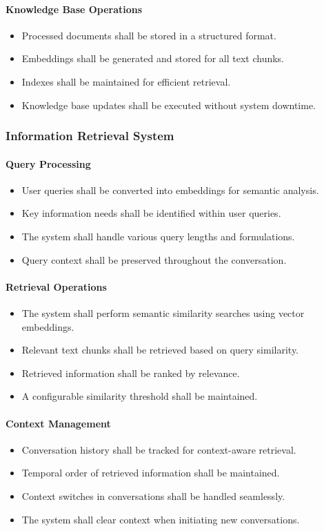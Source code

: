 \documentclass[12pt,a4paper]{report}
\begin{document}
\paragraph{Knowledge Base Operations}
\begin{itemize}
    \item Processed documents shall be stored in a structured format.
    \item Embeddings shall be generated and stored for all text chunks.
    \item Indexes shall be maintained for efficient retrieval.
    \item Knowledge base updates shall be executed without system downtime.
\end{itemize}

\subsubsection{Information Retrieval System}
\paragraph{Query Processing}
\begin{itemize}
    \item User queries shall be converted into embeddings for semantic analysis.
    \item Key information needs shall be identified within user queries.
    \item The system shall handle various query lengths and formulations.
    \item Query context shall be preserved throughout the conversation.
\end{itemize}

\paragraph{Retrieval Operations}
\begin{itemize}
    \item The system shall perform semantic similarity searches using vector embeddings.
    \item Relevant text chunks shall be retrieved based on query similarity.
    \item Retrieved information shall be ranked by relevance.
    \item A configurable similarity threshold shall be maintained.
\end{itemize}

\paragraph{Context Management}
\begin{itemize}
    \item Conversation history shall be tracked for context-aware retrieval.
    \item Temporal order of retrieved information shall be maintained.
    \item Context switches in conversations shall be handled seamlessly.
    \item The system shall clear context when initiating new conversations.
\end{itemize}
\end{document}
